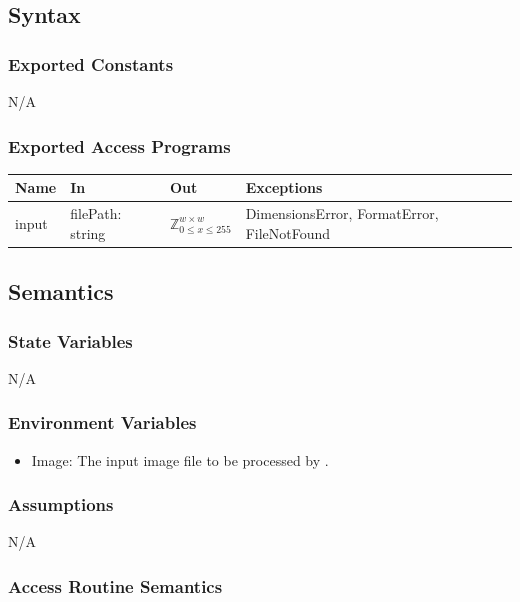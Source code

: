 \documentclass[12pt, titlepage]{article}
\begin{document}
\subsection{Syntax}

\subsubsection{Exported Constants}

N/A

\subsubsection{Exported Access Programs}

\begin{center}
\begin{tabular}{p{2cm} p{2cm} p{3cm} p{6cm}}
\hline
\textbf{Name} & \textbf{In} & \textbf{Out} & \textbf{Exceptions} \\
\hline
input & filePath: string & $\mathbb{Z}^{w \times w}_{0 \le x \le 255}$ & DimensionsError, FormatError, FileNotFound \\
\hline
\end{tabular}
\end{center}

\subsection{Semantics}

\subsubsection{State Variables}

N/A

\subsubsection{Environment Variables}

\begin{itemize}
  \item Image: The input image file to be processed by \progname{}.
\end{itemize}

\subsubsection{Assumptions}

N/A

\subsubsection{Access Routine Semantics}
\end{document}
